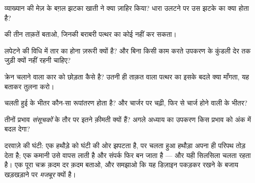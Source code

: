 \begin{exercise}[$\star$]\label{exo:g8:electric-current-effects:3}
व्याख्यान की मेज़ के बग़ल झटका खाती  ने क्या ज़ाहिर किया?
धारा उलटने पर उस झटके का क्या होता है?
\end{exercise}

\begin{exercise}[$\star$]\label{exo:g8:electric-current-effects:4}
 की तीन ताक़तें बताओ, जिनकी बराबरी पत्थर का कोई 
नहीं कर सकता।
\end{exercise}

\begin{exercise}[$\star$]\label{exo:g8:electric-current-effects:5}
लपेटने की विधि में तार का  होना ज़रूरी क्यों है? और बिना
किसी काम करते उपकरण के कुंडली देर तक जुड़ी क्यों नहीं रहनी चाहिए?
\end{exercise}

\begin{exercise}[$\star$]\label{exo:g8:electric-current-effects:6}
क्रेन चलाने वाला कार को छोड़ता कैसे है? उतनी ही ताक़त वाला पत्थर का
 इसके बदले क्या माँगता, यह बताकर तुलना करो।
\end{exercise}

\begin{exercise}[$\star$]\label{exo:g8:electric-current-effects:7}
चलती हुई  के भीतर कौन-सा  रूपांतरण होता है? और चार्जर पर
चढ़ी, फिर से चार्ज होने वाली  के भीतर?
\end{exercise}

\begin{exercise}[$\star$]\label{exo:g8:electric-current-effects:8}
तीनों प्रभाव \emph{संसूचकों} के तौर पर इतने क़ीमती क्यों हैं? अगले
अध्याय का उपकरण किस प्रभाव को अंक में बदल देगा?
\end{exercise}

\begin{exercise}[$\star\star$]\label{exo:g8:electric-current-effects:9}
दरवाज़े की घंटी: एक  हथौड़े को घंटी की ओर झपटता है, पर
चलता हुआ हथौड़ा अपना ही परिपथ तोड़ देता है; एक कमानी उसे वापस लाती है
और संपर्क फिर बन जाता है --- और यही सिलसिला चलता रहता है। एक पूरा चक्र
क़दम दर क़दम बताओ, और समझाओ कि यह डिज़ाइन पकड़कर रखने के बजाय
खड़खड़ाने पर \emph{मजबूर} क्यों है।
\end{exercise}

